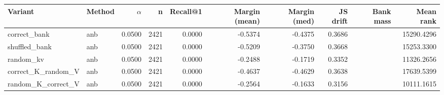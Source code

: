 \begin{tabular}{l l r r r r r r r r}
\toprule
Variant & Method & $\alpha$ & n & Recall@1 & Margin (mean) & Margin (med) & JS drift & Bank mass & Mean rank \\
\midrule
correct\_bank & anb & 0.0500 & 2421 & 0.0000 & -0.5374 & -0.4375 & 0.3686 &  & 15290.4296 \\
shuffled\_bank & anb & 0.0500 & 2421 & 0.0000 & -0.5209 & -0.3750 & 0.3668 &  & 15253.3300 \\
random\_kv & anb & 0.0500 & 2421 & 0.0000 & -0.2488 & -0.1719 & 0.3352 &  & 11326.2656 \\
correct\_K\_random\_V & anb & 0.0500 & 2421 & 0.0000 & -0.4637 & -0.4629 & 0.3638 &  & 17639.5399 \\
random\_K\_correct\_V & anb & 0.0500 & 2421 & 0.0000 & -0.2564 & -0.1633 & 0.3156 &  & 10111.1615 \\
\bottomrule
\end{tabular}
